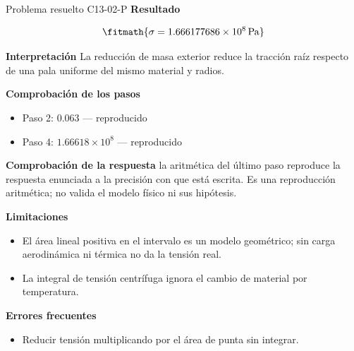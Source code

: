 \documentclass[10pt,openany]{book}
\begin{document}
\begin{studiumworked}{Problema resuelto C13-02-P}
\noindent\textbf{Resultado}

\[
\fitmath{\sigma=1.666177686\times10^{8}\,\mathrm{Pa}}
\]

\noindent\textbf{Interpretación}
La reducción de masa exterior reduce la tracción raíz respecto de una pala uniforme del mismo material y radios.

\noindent\textbf{Comprobación de los pasos}
\begin{itemize}
\item Paso 2: $0.063$ — reproducido
\item Paso 4: $1.66618\times 10^{8}$ — reproducido
\end{itemize}

\noindent\textbf{Comprobación de la respuesta} la aritmética del último paso reproduce la respuesta enunciada a la precisión con que está escrita. Es una reproducción aritmética; no valida el modelo físico ni sus hipótesis.

\noindent\textbf{Limitaciones}
\begin{itemize}
\item El área lineal positiva en el intervalo es un modelo geométrico; sin carga aerodinámica ni térmica no da la tensión real.
\item La integral de tensión centrífuga ignora el cambio de material por temperatura.
\end{itemize}

\noindent\textbf{Errores frecuentes}
\begin{itemize}
\item Reducir tensión multiplicando por el área de punta sin integrar.
\end{itemize}
\end{studiumworked}
\end{document}
